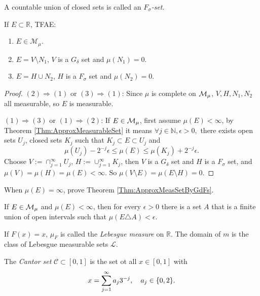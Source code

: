 \begin{defn}
    A countable union of closed sets is called an 
    \textit{$F_{\sigma}$-set}.
\end{defn}
\begin{thm}
    \label{Thm:ApproxMeasSetByGdFs}
    If $E\subset\mathbb{R}$, TFAE:
    \begin{enumerate}
        \item $E\in\mathcal{M}_{\mu}$.
        \item $E=V\setminus N_1$, $V$ is a $G_{\delta}$ set and 
        $\mu(N_1)=0$.
        \item $E=H\cup N_2$, $H$ is a $F_{\sigma}$ set and 
        $\mu(N_2)=0$.
    \end{enumerate}
\end{thm}
\begin{proof}
    $(2)\Rightarrow(1)$ or $(3)\Rightarrow(1)$: Since $\mu$ 
    is complete on $\mathcal{M}_{\mu}$, $V,H,N_1,N_2$ all measurable, 
    so $E$ is measurable.

    $(1)\Rightarrow(3)$ or $(1)\Rightarrow(2)$: If $E\in\mathcal{M}_{\mu}$, 
    first assume $\mu(E)<\infty$, 
    by Theorem \ref{Thm:ApproxMeasurableSet}
    it means $\forall j\in\mathbb{N},\epsilon>0,$ 
    there exists open sets $U_{j}$, closed sets $K_{j}$ such that 
    $K_j\subset E\subset U_j$ and 
    \begin{displaymath}
        \mu(U_j)-2^{-j}\epsilon\le\mu(E)\le\mu(K_{j})+2^{-j}\epsilon.
    \end{displaymath}
    Choose $V:=\cap_{j=1}^{\infty}U_{j}$, $H:=\cup_{j=1}^{\infty}K_j$, 
    then $V$ is a $G_{\delta}$ set and 
    $H$ is a $F_{\sigma}$ set, and 
    $\mu(V)=\mu(H)=\mu(E)<\infty$. So 
    $\mu(V\setminus E)=\mu(E\setminus H)=0$.
\end{proof}
\begin{exc}
    When $\mu(E)=\infty$, prove Theorem \ref{Thm:ApproxMeasSetByGdFs}.
\end{exc}
\begin{exc}
    If $E\in\mathcal{M}_{\mu}$ and $\mu(E)<\infty$, then for every 
    $\epsilon>0$ there is a set $A$ that is a finite union of open 
    intervals such that $\mu(E\triangle A)<\epsilon$.
\end{exc}
\begin{defn}
    If $F(x)=x$, $\mu_{F}$ is called the \textit{Lebesgue measure }on 
    $\mathbb{R}$. The domain of $m$ is the class of Lebesgue 
    measurable sets $\mathcal{L}$.
\end{defn}
\begin{defn}
    The \textit{Cantor set }$\mathcal{C}\subset[0,1]$ is the 
    set ot all $x\in[0,1]$ with 
    \begin{displaymath}
        x=\sum_{j=1}^{\infty}a_j3^{-j},\quad a_j\in\{0,2\}.
    \end{displaymath}
\end{defn}
